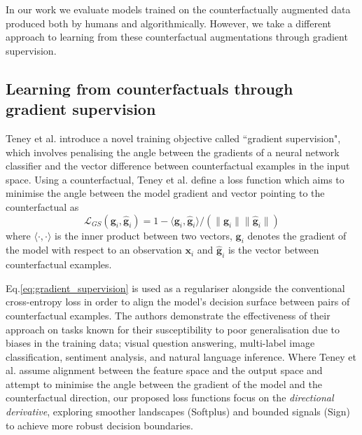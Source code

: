 \documentclass[sigconf,anonymous]{aamas}
\begin{document}
In our work we evaluate models trained on the counterfactually augmented data produced both by humans and algorithmically. However, we take a different approach to learning from these counterfactual augmentations through gradient supervision.

\subsection{Learning from counterfactuals through gradient supervision}
\label{subsec:gradient_supervision}
Teney et al. \cite{teney2020learning} introduce a novel training objective called ``gradient supervision", which involves penalising the angle between the gradients of a neural network classifier and the vector difference between counterfactual examples in the input space. Using a counterfactual, Teney et al. define a loss function which aims to minimise the angle between the model gradient and vector pointing to the counterfactual as 
\begin{equation}
        \mathcal{L}_{GS} \left(\mathbf{g}_i,\hat{\mathbf{g}}_i \right)  = 
        1 - \langle\mathbf{g}_i,\hat{\mathbf{g}}_i \rangle /
        \left( \lVert \mathbf{g}_i \rVert \lVert \hat{\mathbf{g}}_i \rVert \right)
        \label{eq:gradient_supervision}
\end{equation}
where $\langle \cdot, \cdot \rangle$ is the inner product between two vectors, $\mathbf{g}_i$ denotes the gradient of the model with respect to an observation $\mathbf{x}_i$ and $\hat{\mathbf{g}}_i$ is the vector between counterfactual examples.

Eq.\ref{eq:gradient_supervision} is used as a regulariser alongside the conventional cross-entropy loss in order to align the model's decision surface between pairs of counterfactual examples. The authors demonstrate the effectiveness of their approach on tasks known for their susceptibility to poor generalisation due to biases in the training data; visual question answering, multi-label image classification, sentiment analysis, and natural language inference. Where Teney et al. assume alignment between the feature space and the output space and attempt to minimise the angle between the gradient of the model and the counterfactual direction, our proposed loss functions focus on the \emph{directional derivative}, exploring smoother landscapes (Softplus) and bounded signals (Sign) to achieve more robust decision boundaries.
\end{document}
